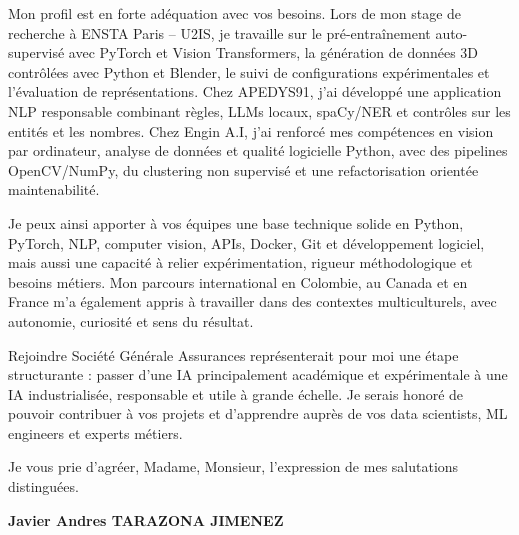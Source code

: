 \documentclass[10pt,a4paper]{article}
\begin{document}
{Mon profil est en forte adéquation avec vos besoins. Lors de mon stage de recherche à ENSTA Paris – U2IS, je travaille sur le pré-entraînement auto-supervisé avec PyTorch et Vision Transformers, la génération de données 3D contrôlées avec Python et Blender, le suivi de configurations expérimentales et l’évaluation de représentations. Chez APEDYS91, j’ai développé une application NLP responsable combinant règles, LLMs locaux, spaCy/NER et contrôles sur les entités et les nombres. Chez Engin A.I, j’ai renforcé mes compétences en vision par ordinateur, analyse de données et qualité logicielle Python, avec des pipelines OpenCV/NumPy, du clustering non supervisé et une refactorisation orientée maintenabilité.

Je peux ainsi apporter à vos équipes une base technique solide en Python, PyTorch, NLP, computer vision, APIs, Docker, Git et développement logiciel, mais aussi une capacité à relier expérimentation, rigueur méthodologique et besoins métiers. Mon parcours international en Colombie, au Canada et en France m’a également appris à travailler dans des contextes multiculturels, avec autonomie, curiosité et sens du résultat.

Rejoindre Société Générale Assurances représenterait pour moi une étape structurante : passer d’une IA principalement académique et expérimentale à une IA industrialisée, responsable et utile à grande échelle. Je serais honoré de pouvoir contribuer à vos projets et d’apprendre auprès de vos data scientists, ML engineers et experts métiers.

Je vous prie d’agréer, Madame, Monsieur, l’expression de mes salutations distinguées.

\vspace{0.8cm}

\textbf{Javier Andres TARAZONA JIMENEZ}

}
\end{document}
